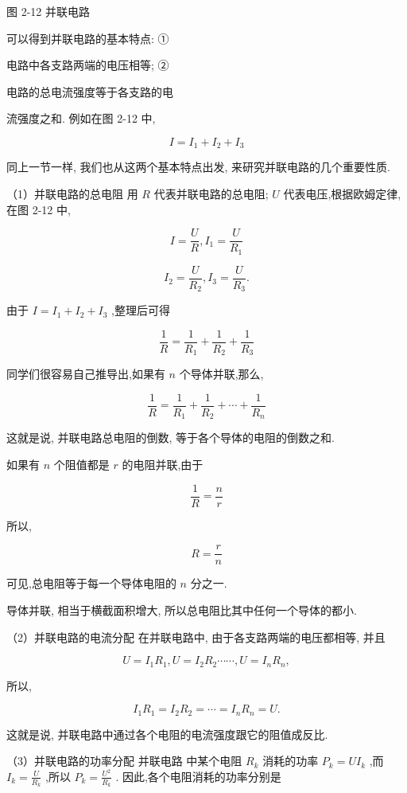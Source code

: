 \documentclass[10pt]{article}
\begin{document}
图 2-12 并联电路

可以得到并联电路的基本特点: ①

电路中各支路两端的电压相等; ②

电路的总电流强度等于各支路的电

流强度之和. 例如在图 2-12 中,

\[
I = {I}_{1} + {I}_{2} + {I}_{3}
\]

同上一节一样, 我们也从这两个基本特点出发, 来研究并联电路的几个重要性质.

（1）并联电路的总电阻 用 \(R\) 代表并联电路的总电阻; \(U\) 代表电压,根据欧姆定律,在图 2-12 中,

\[
I = \frac{U}{R},{I}_{1} = \frac{U}{{R}_{1}}
\]

\[
{I}_{2} = \frac{U}{{R}_{2}},{I}_{3} = \frac{U}{{R}_{3}}.
\]

由于 \(I = {I}_{1} + {I}_{2} + {I}_{3}\) ,整理后可得

\[
\frac{1}{R} = \frac{1}{{R}_{1}} + \frac{1}{{R}_{2}} + \frac{1}{{R}_{3}}
\]

同学们很容易自己推导出,如果有 \(n\) 个导体并联,那么,

\[
\frac{1}{R} = \frac{1}{{R}_{1}} + \frac{1}{{R}_{2}} + \cdots + \frac{1}{{R}_{n}}
\]

这就是说, 并联电路总电阻的倒数, 等于各个导体的电阻的倒数之和.

如果有 \(n\) 个阻值都是 \(r\) 的电阻并联,由于

\[
\frac{1}{R} = \frac{n}{r}
\]

所以,

\[
R = \frac{r}{n}
\]

可见,总电阻等于每一个导体电阻的 \(n\) 分之一.

导体并联, 相当于横截面积增大, 所以总电阻比其中任何一个导体的都小.

（2）并联电路的电流分配 在并联电路中, 由于各支路两端的电压都相等, 并且

\[
U = {I}_{1}{R}_{1},U = {I}_{2}{R}_{2}\cdots \cdots ,U = {I}_{n}{R}_{n},
\]

所以,

\[
{I}_{1}{R}_{1} = {I}_{2}{R}_{2} = \cdots = {I}_{n}{R}_{n} = U.
\]

这就是说, 并联电路中通过各个电阻的电流强度跟它的阻值成反比.

（3）并联电路的功率分配 并联电路 中某个电阻 \({R}_{k}\) 消耗的功率 \({P}_{k} = U{I}_{k}\) ,而 \({I}_{k} = \frac{U}{{R}_{k}}\) ,所以 \({P}_{k} = \frac{{U}^{2}}{{R}_{k}}\) . 因此,各个电阻消耗的功率分别是
\end{document}
